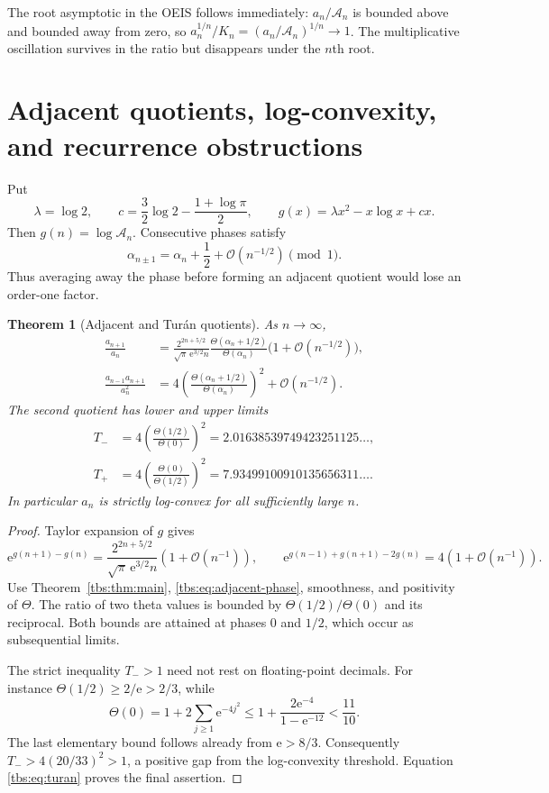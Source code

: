 \documentclass[11pt,a4paper]{article}
\numberwithin{equation}{section}
\newtheorem{theorem}{Theorem}[section]
\theoremstyle{definition}
\newcommand{\Acal}{\mathcal A}
\newcommand{\ee}{\mathrm e}
\newcommand{\OO}{\mathcal O}
\begin{document}
The root asymptotic in the OEIS follows immediately: $a_n/\Acal_n$ is
bounded above and bounded away from zero, so
$a_n^{1/n}/K_n=(a_n/\Acal_n)^{1/n}\to1$.
The multiplicative oscillation survives in the ratio but disappears
under the $n$th root.

\section{Adjacent quotients, log-convexity, and recurrence obstructions}\label{tbs:sec:ratios}

Put
\begin{equation}\label{tbs:eq:g}
 \lambda=\log2,\qquad c=\frac32\log2-\frac{1+\log\pi}{2},\qquad
 g(x)=\lambda x^2-x\log x+cx.
\end{equation}
Then $g(n)=\log\Acal_n$. Consecutive phases satisfy
\begin{equation}\label{tbs:eq:adjacent-phase}
 \alpha_{n\pm1}=\alpha_n+\frac12+\OO(n^{-1/2})\pmod1.
\end{equation}
Thus averaging away the phase before forming an adjacent quotient would
lose an order-one factor.

\begin{theorem}[Adjacent and Tur\'an quotients]\label{tbs:thm:ratios}
As $n\to\infty$,
\begin{align}
 \frac{a_{n+1}}{a_n}
 &=\frac{2^{2n+5/2}}{\sqrt\pi\,\ee^{3/2}n}
   \frac{\Theta(\alpha_n+1/2)}{\Theta(\alpha_n)}
   \bigl(1+\OO(n^{-1/2})\bigr),\label{tbs:eq:adjacent-ratio}\\
 \frac{a_{n-1}a_{n+1}}{a_n^2}
 &=4\left(\frac{\Theta(\alpha_n+1/2)}{\Theta(\alpha_n)}\right)^2
   +\OO(n^{-1/2}).\label{tbs:eq:turan}
\end{align}
The second quotient has lower and upper limits
\begin{align}
 T_-&=4\left(\frac{\Theta(1/2)}{\Theta(0)}\right)^2
       =2.01638539749423251125\ldots,\label{tbs:eq:turan-lower}\\
 T_+&=4\left(\frac{\Theta(0)}{\Theta(1/2)}\right)^2
       =7.93499100910135656311\ldots.\label{tbs:eq:turan-upper}
\end{align}
In particular $a_n$ is strictly log-convex for all sufficiently large $n$.
\end{theorem}
\begin{proof}
Taylor expansion of $g$ gives
\[
 \ee^{g(n+1)-g(n)}
 =\frac{2^{2n+5/2}}{\sqrt\pi\,\ee^{3/2}n}(1+\OO(n^{-1})),
 \qquad
 \ee^{g(n-1)+g(n+1)-2g(n)}=4(1+\OO(n^{-1})).
\]
Use Theorem~\ref{tbs:thm:main}, \eqref{tbs:eq:adjacent-phase}, smoothness, and
positivity of $\Theta$. The ratio of two theta values is bounded by
$\Theta(1/2)/\Theta(0)$ and its reciprocal. Both bounds are attained at
phases $0$ and $1/2$, which occur as subsequential limits.

The strict inequality $T_->1$ need not rest on floating-point decimals.
For instance $\Theta(1/2)\ge2/\ee>2/3$, while
\[
 \Theta(0)=1+2\sum_{j\ge1}\ee^{-4j^2}
 \le1+\frac{2\ee^{-4}}{1-\ee^{-12}}<\frac{11}{10}.
\]
The last elementary bound follows already from $\ee>8/3$.
Consequently $T_->4(20/33)^2>1$, a positive gap from the
log-convexity threshold. Equation \eqref{tbs:eq:turan} proves the final
assertion.
\end{proof}
\end{document}
